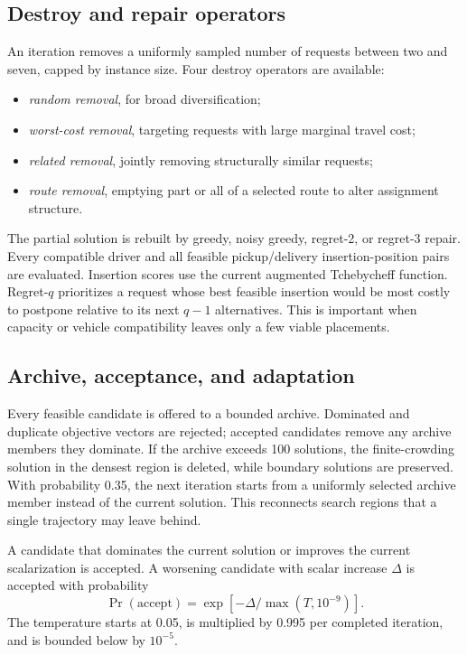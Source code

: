 \documentclass[11pt,a4paper]{article}
\begin{document}
\subsection{Destroy and repair operators}

An iteration removes a uniformly sampled number of requests between two and seven, capped by instance size. Four destroy operators are available:
\begin{itemize}[leftmargin=*,itemsep=1pt]
    \item \emph{random removal}, for broad diversification;
    \item \emph{worst-cost removal}, targeting requests with large marginal travel cost;
    \item \emph{related removal}, jointly removing structurally similar requests;
    \item \emph{route removal}, emptying part or all of a selected route to alter assignment structure.
\end{itemize}
The partial solution is rebuilt by greedy, noisy greedy, regret-2, or regret-3 repair. Every compatible driver and all feasible pickup/delivery insertion-position pairs are evaluated. Insertion scores use the current augmented Tchebycheff function. Regret-$q$ prioritizes a request whose best feasible insertion would be most costly to postpone relative to its next $q-1$ alternatives. This is important when capacity or vehicle compatibility leaves only a few viable placements.

\subsection{Archive, acceptance, and adaptation}

Every feasible candidate is offered to a bounded archive. Dominated and duplicate objective vectors are rejected; accepted candidates remove any archive members they dominate. If the archive exceeds 100 solutions, the finite-crowding solution in the densest region is deleted, while boundary solutions are preserved. With probability 0.35, the next iteration starts from a uniformly selected archive member instead of the current solution. This reconnects search regions that a single trajectory may leave behind.

A candidate that dominates the current solution or improves the current scalarization is accepted. A worsening candidate with scalar increase $\Delta$ is accepted with probability
\begin{equation}
 \Pr(\text{accept})=\exp[-\Delta/\max(T,10^{-9})].
\end{equation}
The temperature starts at 0.05, is multiplied by 0.995 per completed iteration, and is bounded below by $10^{-5}$.
\end{document}
